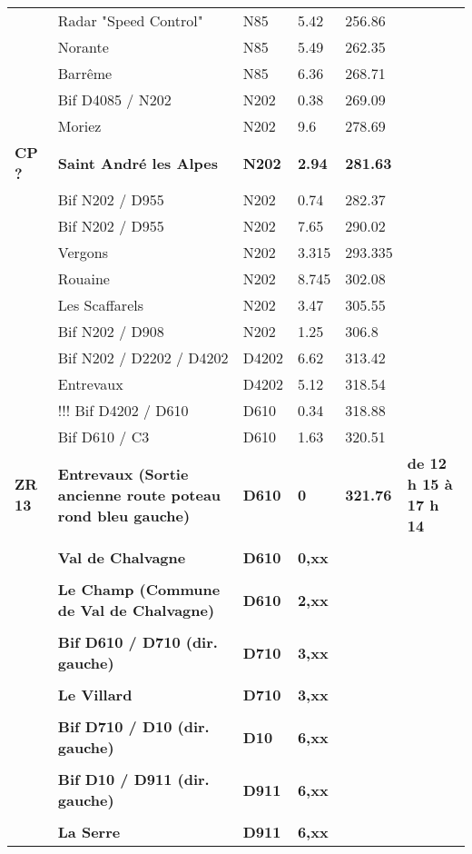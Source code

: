 \documentclass{article}%
\begin{document}
\begin{longtable}{p{2.25cm}|p{7.0cm}|p{1.5cm}|p{1.5cm}|p{1.5cm}|p{3.5cm}}
 &Radar "Speed Control"&N85&5.42&256.86& \\%
 &Norante&N85&5.49&262.35& \\%
 &Barrême&N85&6.36&268.71& \\%
 &Bif D4085 / N202&N202&0.38&269.09& \\%
 &Moriez&N202&9.6&278.69& \\%
\textbf{CP ? }&\textbf{Saint André les Alpes}&\textbf{N202}&\textbf{2.94}&\textbf{281.63}& \\%
 &Bif N202 / D955&N202&0.74&282.37& \\%
 &Bif N202 / D955&N202&7.65&290.02& \\%
 &Vergons&N202&3.315&293.335& \\%
 &Rouaine&N202&8.745&302.08& \\%
 &Les Scaffarels&N202&3.47&305.55& \\%
 &Bif N202 / D908&N202&1.25&306.8& \\%
 &Bif N202 / D2202 / D4202&D4202&6.62&313.42& \\%
 &Entrevaux &D4202&5.12&318.54& \\%
 &!!! Bif D4202 / D610&D610&0.34&318.88& \\%
 &Bif D610 / C3 &D610&1.63&320.51& \\%
\textbf{ZR 13}&\textbf{Entrevaux (Sortie ancienne route poteau rond bleu gauche)}&\textbf{D610}&\textbf{0}&\textbf{321.76}&\textbf{de 12 h 15 à 17 h 14}\\%
 & & & & & \\%
 &\textbf{Val de Chalvagne}&\textbf{D610 }&\textbf{0,xx}& & \\%
 & & & & & \\%
 &\textbf{Le Champ (Commune de Val de Chalvagne)}&\textbf{D610}&\textbf{2,xx}& & \\%
 & & & & & \\%
 &\textbf{Bif D610 / D710 (dir. gauche)}&\textbf{D710}&\textbf{3,xx}& & \\%
 & & & & & \\%
 &\textbf{Le Villard}&\textbf{D710}&\textbf{3,xx}& & \\%
 & & & & & \\%
 &\textbf{Bif D710 / D10 (dir. gauche)}&\textbf{D10}&\textbf{6,xx}& & \\%
 & & & & & \\%
 &\textbf{Bif D10  / D911  (dir. gauche)}&\textbf{D911 }&\textbf{6,xx}& & \\%
 & & & & & \\%
 &\textbf{La Serre}&\textbf{D911 }&\textbf{6,xx}& & \\%

\end{longtable}
\end{document}
